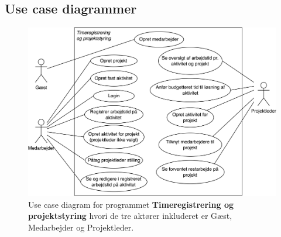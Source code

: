 \subsection{Use case diagrammer}
\begin{figure}[H]
    \centering
    \caption{Use case diagram for programmet \textbf{Timeregistrering og projektstyring} hvori de tre aktører inkluderet er Gæst, Medarbejder og Projektleder.}\label{fig:AlleActorsPaaEnGang}
    \includegraphics[width=.85\textwidth]{Diagrams/Timeregistrering og projektstyring.png}
\end{figure}
